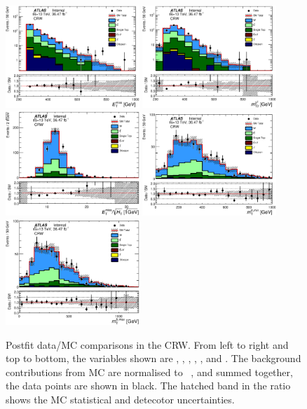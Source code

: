 \begin{figure}[!htb]
  \centering
  \includegraphics[width=0.45\textwidth]{figures/wJets/postfit/Met_CRW_log.eps}
  \includegraphics[width=0.45\textwidth]{figures/wJets/postfit/MT2Chi2_CRW_log.eps}
  \includegraphics[width=0.45\textwidth]{figures/wJets/postfit/HtSig_CRW.eps}
  \includegraphics[width=0.45\textwidth]{figures/wJets/postfit/MtBMin_CRW.eps}
  \includegraphics[width=0.45\textwidth]{figures/wJets/postfit/MtBMax_CRW.eps}
  \caption{Postfit data/MC comparisons in the CRW. From left to right and top to bottom, the variables shown are \met, \mtbmin, \mtbmax, \mantikttwelvezero, \mantikttwelveone, and \mantikteightzero. The background contributions from MC are normalised to \intlumi\ \ifb, and summed together, the data points are shown in black. The hatched band in the ratio shows the MC statistical and detecotor uncertainties.}
  \label{fig:CRW}
\end{figure}

